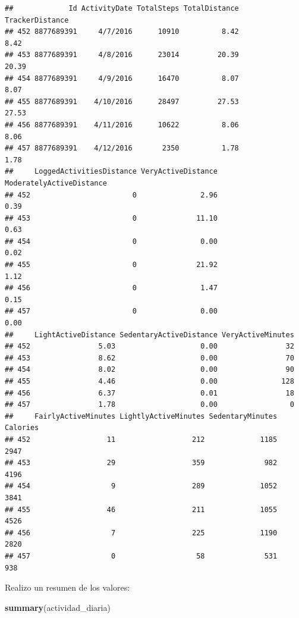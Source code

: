 \documentclass[
]{article}
\newenvironment{Shaded}{\begin{snugshade}}{\end{snugshade}}
\newcommand{\FunctionTok}[1]{\textcolor[rgb]{0.13,0.29,0.53}{\textbf{#1}}}
\newcommand{\NormalTok}[1]{#1}
\begin{document}
\begin{verbatim}
##             Id ActivityDate TotalSteps TotalDistance TrackerDistance
## 452 8877689391     4/7/2016      10910          8.42            8.42
## 453 8877689391     4/8/2016      23014         20.39           20.39
## 454 8877689391     4/9/2016      16470          8.07            8.07
## 455 8877689391    4/10/2016      28497         27.53           27.53
## 456 8877689391    4/11/2016      10622          8.06            8.06
## 457 8877689391    4/12/2016       2350          1.78            1.78
##     LoggedActivitiesDistance VeryActiveDistance ModeratelyActiveDistance
## 452                        0               2.96                     0.39
## 453                        0              11.10                     0.63
## 454                        0               0.00                     0.02
## 455                        0              21.92                     1.12
## 456                        0               1.47                     0.15
## 457                        0               0.00                     0.00
##     LightActiveDistance SedentaryActiveDistance VeryActiveMinutes
## 452                5.03                    0.00                32
## 453                8.62                    0.00                70
## 454                8.02                    0.00                90
## 455                4.46                    0.00               128
## 456                6.37                    0.01                18
## 457                1.78                    0.00                 0
##     FairlyActiveMinutes LightlyActiveMinutes SedentaryMinutes Calories
## 452                  11                  212             1185     2947
## 453                  29                  359              982     4196
## 454                   9                  289             1052     3841
## 455                  46                  211             1055     4526
## 456                   7                  225             1190     2820
## 457                   0                   58              531      938
\end{verbatim}

Realizo un resumen de los valores:

\begin{Shaded}
\begin{Highlighting}[]
\FunctionTok{summary}\NormalTok{(actividad\_diaria)}
\end{Highlighting}
\end{Shaded}
\end{document}
